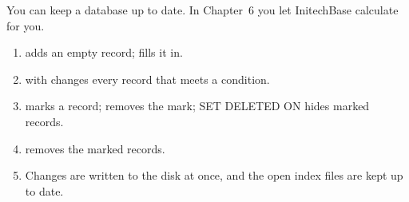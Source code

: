 You can keep a database up to date.  In Chapter~6 you let InitechBase calculate
for you.

\begin{enumerate}
\item {} adds an empty record;  
    fills it in.
\item {} with  changes every record that meets a condition.
\item {} marks a record;  removes the mark; SET DELETED ON
  hides marked records.
\item {} removes the marked records.
\item Changes are written to the disk at once, and the open index files are kept
  up to date.
\end{enumerate}
